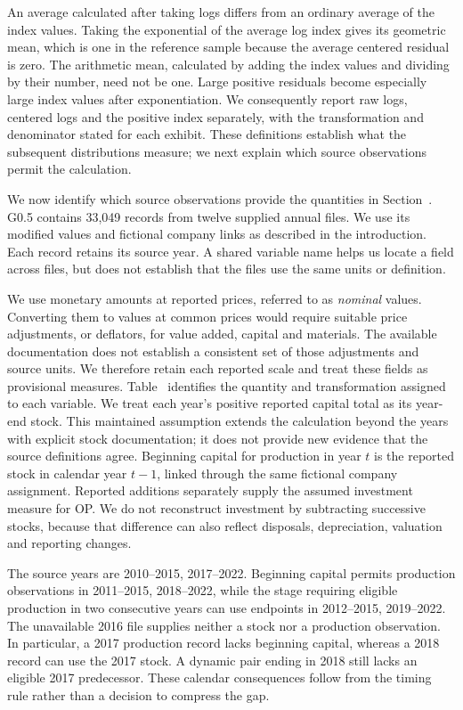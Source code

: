 An average calculated after taking logs differs from an ordinary average of the index values. Taking the exponential of the average log index gives its geometric mean, which is one in the reference sample because the average centered residual is zero. The arithmetic mean, calculated by adding the index values and dividing by their number, need not be one. Large positive residuals become especially large index values after exponentiation. We consequently report raw logs, centered logs and the positive index separately, with the transformation and denominator stated for each exhibit. These definitions establish what the subsequent distributions measure; we next explain which source observations permit the calculation.

We now identify which source observations provide the quantities in Section~. G0.5 contains 33,049 records from twelve supplied annual files. We use its modified values and fictional company links as described in the introduction. Each record retains its source year. A shared variable name helps us locate a field across files, but does not establish that the files use the same units or definition.

We use monetary amounts at reported prices, referred to as \emph{nominal} values. Converting them to values at common prices would require suitable price adjustments, or deflators, for value added, capital and materials. The available documentation does not establish a consistent set of those adjustments and source units. We therefore retain each reported scale and treat these fields as provisional measures. Table~ identifies the quantity and transformation assigned to each variable.
We treat each year's positive reported capital total as its year-end stock. This maintained assumption extends the calculation beyond the years with explicit stock documentation; it does not provide new evidence that the source definitions agree. Beginning capital for production in year $t$ is the reported stock in calendar year $t-1$, linked through the same fictional company assignment. Reported additions separately supply the assumed investment measure for OP. We do not reconstruct investment by subtracting successive stocks, because that difference can also reflect disposals, depreciation, valuation and reporting changes.

The source years are 2010--2015, 2017--2022. Beginning capital permits production observations in 2011--2015, 2018--2022, while the stage requiring eligible production in two consecutive years can use endpoints in 2012--2015, 2019--2022. The unavailable 2016 file supplies neither a stock nor a production observation. In particular, a 2017 production record lacks beginning capital, whereas a 2018 record can use the 2017 stock. A dynamic pair ending in 2018 still lacks an eligible 2017 predecessor. These calendar consequences follow from the timing rule rather than a decision to compress the gap.


